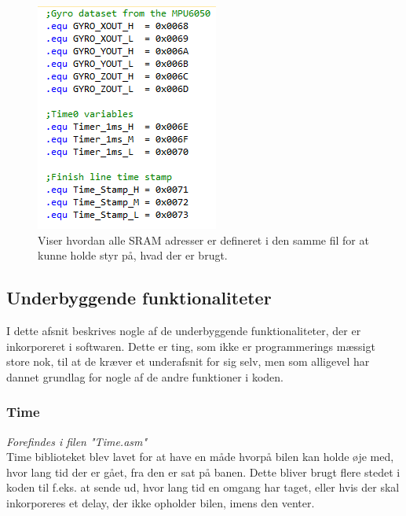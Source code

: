 \begin{figure}[h]
\begin{minipage}{.5\textwidth}
\begin{minipage}{.85\textwidth}
			\includegraphics[scale=0.1,width=\linewidth]{Billeder/SRAM_Example.PNG}
			\caption{Viser hvordan alle SRAM adresser er defineret i den samme fil for at kunne holde styr på, hvad der er 					brugt.}
			\label{fig:SRAMExample}
			\end{minipage}
	\end{minipage}
\end{figure}


\subsection{Underbyggende funktionaliteter}
I dette afsnit beskrives nogle af de underbyggende funktionaliteter, der er inkorporeret i softwaren. Dette er ting, som ikke er programmerings mæssigt store nok, til at de kræver et underafsnit for sig selv, men som alligevel har dannet grundlag for nogle af de andre funktioner i koden.

\subsubsection{Time}
\textit{Forefindes i filen "Time.asm"}\\
Time biblioteket blev lavet for at have en måde hvorpå bilen kan holde øje med, hvor lang tid der er gået, fra den er sat på banen. Dette bliver brugt flere stedet i koden til f.eks. at sende ud, hvor lang tid en omgang har taget, eller hvis der skal inkorporeres et delay, der ikke opholder bilen, imens den venter. 

